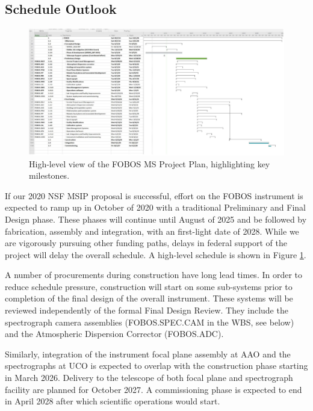 \documentclass[oneside,11pt]{amsart}
\begin{document}
\subsection{Schedule Outlook}

\begin{figure}[h!]
\vskip -0.1in
\includegraphics[width=\textwidth]{gantt_v1.pdf}
\caption{\small High-level view of the FOBOS MS Project Plan, highlighting key milestones.}
\label{fig:gantt}
\end{figure}

If our 2020 NSF MSIP proposal is successful, effort on the FOBOS
instrument is expected to ramp up in October of 2020 with a
traditional Preliminary and Final Design phase. These phases will
continue until August of 2025 and be followed by fabrication,
assembly and integration, with an first-light date of 2028. While we
are vigorously pursuing other funding paths, delays in federal
support of the project will delay the overall schedule. A high-level
schedule is shown in Figure \ref{fig:gantt}.

A number of procurements during construction have long lead times. In
order to reduce schedule pressure, construction will start on some
sub-systems prior to completion of the final design of the overall
instrument. These systems will be reviewed independently of the
formal Final Design Review. They include the spectrograph camera
assemblies (FOBOS.SPEC.CAM in the WBS, see below) and the Atmospheric
Dispersion Corrector (FOBOS.ADC).

Similarly, integration of the instrument focal plane assembly at AAO
and the spectrographs at UCO is expected to overlap with the
construction phase starting in March 2026. Delivery to the telescope
of both focal plane and spectrograph facility are planned for October
2027. A commissioning phase is expected to end in April 2028 after
which scientific operations would start.
\end{document}
